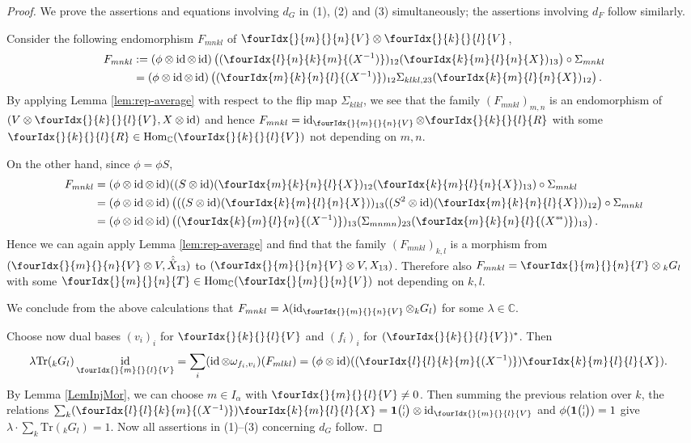 \documentclass[10pt]{article}
\DeclareMathOperator{\id}{id}
\DeclareMathOperator{\Hom}{Hom}
\newcommand{\dual}[1]{#1^{*}}
\newcommand{\C}{\mathbb{C}}
\newcommand{\Tr}{\mathrm{Tr}}
\newcommand{\GrDA}[3]{{}_{#2}#1_{#3}} %
\newcommand{\Grt}[3]{#1{\tiny {\begin{pmatrix} #2\\#3\end{pmatrix}}}}
\newcommand{\UnitC}[2]{\Grt{\mathbf{1}}{#1}{#2}}
\newcommand{\Gr}[5]{\fourIdx{#2}{#4}{#3}{#5}{#1}}%
\newcommand{\Gru}[3]{\Gr{#1}{}{}{#2}{#3}}
\theoremstyle{definition}
\numberwithin{equation}{section}
\begin{document}
\begin{proof}
  We prove the assertions and equations involving $d_G$ in (1), (2)
  and (3)  simultaneously; the assertions involving $d_F$  follow similarly.

  Consider
  the following endomorphism $F_{mnkl}$ of $\Gru{V}{m}{n}\otimes \Gru{V}{k}{l}$, 
  \begin{align*}
    F_{mnkl}
    &:=(\phi \otimes \id \otimes \id)\left((\Gr{(X^{-1})}{l}{k}{n}{m})_{12}(\Gr{X}{k}{l}{m}{n})_{13}\right)
    \circ \Sigma_{mnkl} \\ &= (\phi \otimes \id \otimes
    \id)\left((\Gr{(X^{-1})}{m}{n}{k}{l})_{12}
      \Sigma_{klkl,23}(\Gr{X}{k}{l}{m}{n})_{12}\right).
  \end{align*}
  By applying Lemma \ref{lem:rep-average} with respect to the flip map $\Sigma_{klkl}$, we see that the family $(F_{mnkl})_{m,n}$ is
  an endomorphism of $(V \otimes \Gru{V}{k}{l}, X\otimes \id)$ and hence
  $F_{mnkl} = \id_{\Gru{V}{m}{n}} \otimes \Gru{R}{k}{l}$ with some $\Gru{R}{k}{l} \in \Hom_{\C}(\Gru{V}{k}{l})$ not
  depending on $m,n$. 
  
  On the other hand, since $\phi = \phi S$,
  \begin{align*}
    F_{mnkl} &= (\phi \otimes \id \otimes \id)((S \otimes
    \id)(\Gr{X}{m}{n}{k}{l})_{12}(\Gr{X}{k}{l}{m}{n})_{13})
    \circ \Sigma_{mnkl} \\
    &= (\phi \otimes \id \otimes \id)\left(((S \otimes
      \id)(\Gr{X}{k}{l}{m}{n}))_{13}
      ((S^{2} \otimes \id)(\Gr{X}{m}{n}{k}{l}))_{12}\right)     \circ \Sigma_{mnkl}\\
    &= (\phi \otimes \id \otimes
    \id)\left((\Gr{(X^{-1})}{k}{l}{m}{n})_{13} (\Sigma_{mnmn})_{23}
      (\Gr{(\dual{\dual{X}{}\!})}{m}{n}{k}{l})_{13}\right).
  \end{align*}
  Hence we can again apply Lemma \ref{lem:rep-average} and
  find that the family $(F_{mnkl})_{k,l}$ is a morphism from $(\Gru{V}{m}{n} \otimes V, \hat{\hat{X}}_{13})$ to $(\Gru{V}{m}{n} \otimes V,
 X_{13})$. Therefore also $F_{mnkl} = \Gru{T}{m}{n} \otimes \GrDA{G}{k}{l}$
  with some $\Gru{T}{m}{n} \in \mathcal{\Hom_{\C}}(\Gru{V}{m}{n})$
  not depending on $k,l$. 
  
  We conclude from the above calculations that $F_{mnkl} = \lambda
  (\id_{\Gru{V}{m}{n}} \otimes \GrDA{G}{k}{l})$  for some $\lambda\in \C$.
   
  Choose now dual  bases
  $(v_{i})_{i}$ for $\Gru{V}{k}{l}$ and $(f_{i})_{i}$ for  $\dual{(\Gru{V}{k}{l})}$. Then
  \begin{align*}
    \lambda   \Tr( \GrDA{G}{k}{l}) \id_{\Gru{V}{m}{l}}
 &= \sum_{i} (\id \otimes
    \omega_{f_{i},v_{i}})(F_{mlkl}) = (\phi \otimes
    \id)((\Gr{(X^{-1})}{l}{k}{l}{m}) \Gr{X}{k}{l}{m}{l}).
  \end{align*}
   By Lemma \ref{LemInjMor}, we can choose $m\in I_{\alpha}$ with $\Gru{V}{m}{l}\neq 0$.   Then summing the previous relation over $k$, the relations $\sum_{k}
  (\Gr{(X^{-1})}{l}{k}{l}{m}) \Gr{X}{k}{l}{m}{l} = \UnitC{l}{l}
  \otimes \id_{\Gru{V}{m}{l}}$ and
  $\phi(\UnitC{l}{l})=1$ give $\lambda \cdot  \sum_{k} \Tr(\GrDA{G}{k}{l}) = 1.$
Now all assertions in (1)--(3) concerning $d_G$ follow.
\end{proof}
\end{document}

